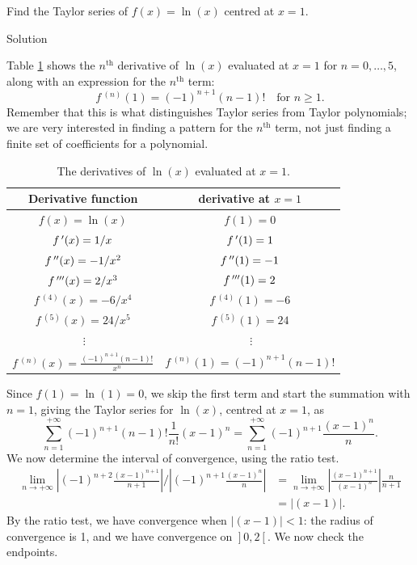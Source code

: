 \begin{example}\label{ex_ts2}
Find the Taylor series of $f(x) = \ln(x)$ centred at $x=1$.

Solution 

Table \ref{tab_series_4} shows the $n^\text{th}$ derivative of $\ln(x)$ evaluated at $x=1$ for $n=0,\ldots,5$, along with an expression for the $n^\text{th}$ term: $$f\,^{(n)}(1) = (-1)^{n+1}(n-1)!\quad \text{for $n\geq 1$.}$$ Remember that this is what distinguishes Taylor series from Taylor polynomials; we are very interested in finding a pattern for the $n^\text{th}$ term, not just finding a finite set of coefficients for a polynomial.

\begin{table}[H]
\caption{The derivatives of $\ln(x)$ evaluated at $x=1$.}
\label{tab_series_4}
\renewcommand{\arraystretch}{1.5}
\begin{tabular}{c|c}
Derivative function&derivative at $x=1$\\\hline
$f(x) = \ln(x) $&$f(1) = 0$\\
$f\,'(x) = 1/x $&$f\,'(1) = 1$\\
$f\,''(x) = -1/x^2 $&$f\,''(1) = -1$\\
$f\,'''(x) = 2/x^3 $&$f\,'''(1) = 2$\\
$f\,^{(4)}(x) = -6/x^4 $&$f\,^{(4)}(1) = -6$\\
$f\,^{(5)}(x) = 24/x^5 $&$f\,^{(5)}(1) = 24$\\
$\ \vdots $& $\ \vdots$\\
$f\,^{(n)}(x) = \frac{(-1)^{n+1}(n-1)!}{x^n}$ & $f\,^{(n)}(1) = (-1)^{n+1}(n-1)!$\\
\end{tabular}
\renewcommand{\arraystretch}{1}
\end{table}


Since $f(1) = \ln(1) = 0$, we skip the first term and start the summation with $n=1$, giving the Taylor series for $\ln(x)$, centred at $x=1$, as 
$$\sum_{n=1}^{+\infty} (-1)^{n+1}(n-1)!\frac{1}{n!}(x-1)^n = \sum_{n=1}^{+\infty} (-1)^{n+1}\frac{(x-1)^n}{n}. $$
We now determine the interval of convergence, using the ratio test.
\begin{align*}
\lim_{n\to+\infty} \left|(-1)^{n+2}\frac{(x-1)^{n+1}}{n+1}\right|\Bigg/\left|(-1)^{n+1}\frac{(x-1)^n}{n}\right| &= \lim_{n\to+\infty} \left|\frac{(x-1)^{n+1}}{(x-1)^n}\right|\frac{n}{n+1}\\[0.2cm]
&= \big|(x-1)\big|.
\end{align*}
By the ratio test, we have convergence when $\big|(x-1)\big| <1$: the radius of convergence is 1, and we have convergence on $\left.\right]0,2\left[\right.$. We now check the endpoints.


\end{example}
